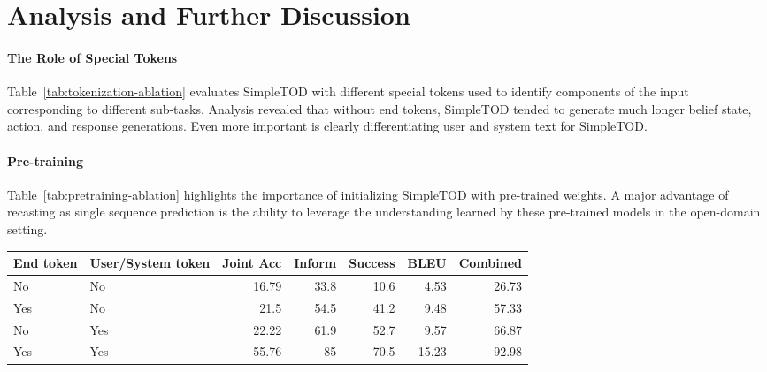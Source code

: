 \documentclass{article}
\begin{document}
\section{Analysis and Further Discussion}
\label{sec:analysis_results}


\paragraph{The Role of Special Tokens} 
Table~\ref{tab:tokenization-ablation}  evaluates SimpleTOD with different special tokens used to identify components of the input corresponding to different sub-tasks.
Analysis revealed that without end tokens, 
SimpleTOD tended to generate much longer belief state, action, and response generations. 
Even more important is clearly differentiating user and system text for SimpleTOD.

\paragraph{Pre-training}
Table~\ref{tab:pretraining-ablation} highlights the importance of initializing SimpleTOD with pre-trained weights. 
A major advantage of recasting as single sequence prediction is the ability to leverage the understanding learned by these pre-trained models in the open-domain setting.

\begin{table*}[t]
\centering
\small
\begin{tabular}{llrrrrr}
\hline
 End token & User/System token & Joint Acc & Inform& Success& BLEU & Combined\\

\hline
 No & No  & 16.79 & 33.8 & 10.6 & 4.53 & 26.73 \\
   Yes & No  & 21.5 & 54.5 & 41.2 &  9.48 & 57.33 \\
   No & Yes  & 22.22 & 61.9 & 52.7 & 9.57 & 66.87 \\
   Yes & Yes  & 55.76 & 85 & 70.5 & 15.23 & 92.98 \\
\hline
\end{tabular}
\caption{\label{tab:tokenization-ablation}
Ablations on MultiWOZ 2.1 comparing the presence and absence of different special tokens when representing TOD as a single sequence. 
Performance on all metrics drops without \textit{<endof(segment)>} and \textit{<user/system>} tokens.
}
\end{table*}
\end{document}
